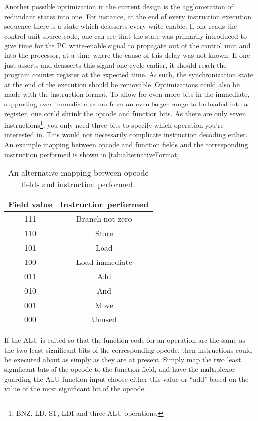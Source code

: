 \documentclass[11pt]{article}
\begin{document}
Another possible optimization in the current design is the
agglomeration of redundant states into one. For instance, at the end
of every instruction execution sequence there is a state which
deasserts every write-enable. If one reads the control unit source
code, one can see that the state was primarily introduced to give time
for the PC write-enable signal to propagate out of the control unit
and into the processor, at a time where the cause of this delay was
not known. If one just asserts and deasserts this signal one cycle
earlier, it should reach the program counter register at the expected
time. As such, the synchronization state at the end of the execution
should be removable.
\newline
Optimizations could also be made with the instruction format. To allow
for even more bits in the immediate, supporting even immediate values
from an even larger range to be loaded into a register, one could
shrink the opcode and function bits. As there are only seven
instructions\footnote{BNZ, LD, ST, LDI and three ALU operations.}, you
only need three bits to specify which operation you're interested
in. This would not necessarily complicate instruction decoding
either. An example mapping between opcode and function fields and the
corresponding instruction performed is shown in
\autoref{tab:alternativeFormat}. 
\begin{table}[htbp]
  \centering
  \begin{tabular}{|c|c|}
    \hline
    {\bf Field value} & {\bf Instruction performed} \\ \hline
    111 & Branch not zero \\ \hline
    110 & Store \\ \hline
    101 & Load \\ \hline
    100 & Load immediate \\ \hline
    011 & Add \\ \hline
    010 & And \\ \hline
    001 & Move \\ \hline
    000 & Unused \\ \hline
  \end{tabular}
  \caption{An alternative mapping between opcode fields and instruction performed.}
  \label{tab:alternativeFormat}
\end{table}
If the ALU is edited so that the
function code for an operation are the same as the two least
significant bits of the corresponding opcode, then instructions could
be executed about as simply as they are at present. Simply map the two
least significant bits of the opcode to the function field, and have
the multiplexor guarding the ALU function input choose either this
value or ``add'' based on the value of the most significant bit of the
opcode. 
\end{document}
